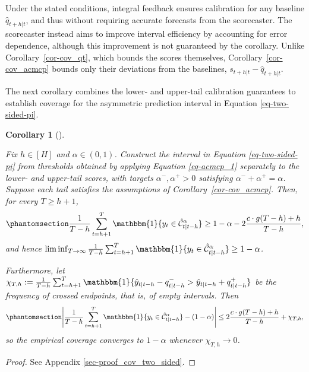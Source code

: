 \documentclass[
  american,
  12pt]{article}
\theoremstyle{plain}
\newtheorem{corollary}{Corollary}[section]
\theoremstyle{plain}
\theoremstyle{remark}
\begin{document}
Under the stated conditions, integral feedback ensures calibration for
any baseline \(\hat q_{t+h|t}\), and thus without requiring accurate
forecasts from the scorecaster. The scorecaster instead aims to improve
interval efficiency by accounting for error dependence, although this
improvement is not guaranteed by the corollary. Unlike
Corollary~\ref{cor-cov_qt}, which bounds the scores themselves,
Corollary~\ref{cor-cov_acmcp} bounds only their deviations from the
baselines, \(s_{t+h|t}-\hat q_{t+h|t}\).

The next corollary combines the lower- and upper-tail calibration
guarantees to establish coverage for the asymmetric prediction interval
in Equation \eqref{eq-two-sided-pi}.

\begin{corollary}[]\protect\hypertarget{cor-cov-two-sided}{}\label{cor-cov-two-sided}

Fix \(h\in[H]\) and \(\alpha\in(0,1)\). Construct the interval in
Equation \eqref{eq-two-sided-pi} from thresholds obtained by applying
Equation \eqref{eq-acmcp_1} separately to the lower- and upper-tail
scores, with targets \(\alpha^{-},\alpha^{+}>0\) satisfying
\(\alpha^{-}+\alpha^{+}=\alpha\). Suppose each tail satisfies the
assumptions of Corollary~\ref{cor-cov_acmcp}. Then, for every
\(T\geq h+1\),
\begin{equation}\phantomsection\label{eq-two-sided-finite}{
\frac{1}{T-h}\sum_{t=h+1}^{T}\mathbbm{1}\{y_t\in\hat{\mathcal C}_{t|t-h}^{\alpha}\}
\geq 1-\alpha-2\frac{c\cdot g(T-h)+h}{T-h},
}\end{equation} and hence
\(\liminf_{T\to\infty}\frac{1}{T-h}\sum_{t=h+1}^{T}\mathbbm{1}\{y_t\in\hat{\mathcal C}_{t|t-h}^{\alpha}\}\geq1-\alpha\).

Furthermore, let
\(\chi_{T,h}:=\frac{1}{T-h}\sum_{t=h+1}^{T}\mathbbm{1}\{\hat y_{t|t-h}-q_{t|t-h}^{-}>\hat y_{t|t-h}+q_{t|t-h}^{+}\}\)
be the frequency of crossed endpoints, that is, of empty intervals. Then
\begin{equation}\phantomsection\label{eq-two-sided-enhanced}{
\left|\frac{1}{T-h}\sum_{t=h+1}^{T}\mathbbm{1}\{y_t\in\hat{\mathcal C}_{t|t-h}^{\alpha}\}
-(1-\alpha)\right|\leq 2\frac{c \cdot g(T-h)+h}{T-h}+\chi_{T,h},
}\end{equation} so the empirical coverage converges to \(1-\alpha\)
whenever \(\chi_{T,h}\to0\).

\end{corollary}

\begin{proof}
See Appendix \ref{sec-proof_cov_two_sided}.
\end{proof}
\end{document}
